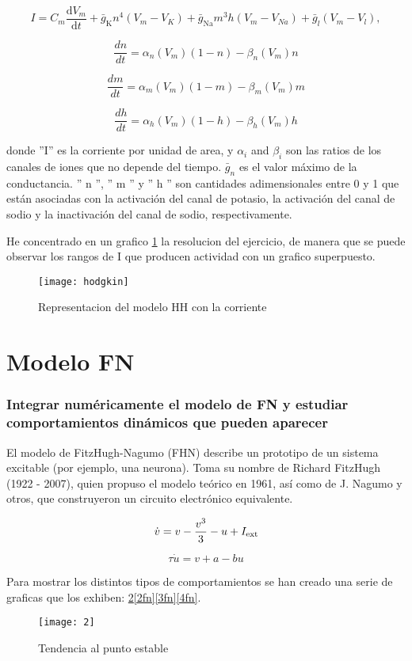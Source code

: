  $$I = C_m\frac{{\mathrm d} V_m}{{\mathrm d} t}  + \bar{g}_\text{K}n^4(V_m - V_K) + \bar{g}_\text{Na}m^3h(V_m - V_{Na}) + \bar{g}_l(V_m - V_l),$$

 $$\frac{dn}{dt} = \alpha_n(V_m)(1 - n) - \beta_n(V_m) n$$

 $$\frac{dm}{dt} = \alpha_m(V_m)(1 - m)  - \beta_m(V_m) m$$

 $$\frac{dh}{dt} = \alpha_h(V_m)(1 - h) - \beta_h(V_m) h$$

donde ''I'' es la corriente por unidad de area, y $\alpha_i $ and $\beta_i $ son las ratios de los canales de iones que no depende del tiempo. $\bar{g}_n$ es el valor máximo de la conductancia. '' n '', '' m '' y '' h '' son cantidades adimensionales entre 0 y 1 que están asociadas con la activación del canal de potasio, la activación del canal de sodio y la inactivación del canal de sodio, respectivamente. 

He concentrado en un grafico \ref{h} la resolucion del ejercicio, de manera que se puede observar los rangos de I que producen actividad con un grafico superpuesto. 
\begin{figure}
	\centering
	\texttt{[image: hodgkin]}
	\caption{Representacion del modelo HH con la corriente}
	\label{h}
\end{figure}

\section{Modelo FN}

\subsubsection{\large Integrar numéricamente el modelo de FN y estudiar comportamientos dinámicos que pueden aparecer} 


El modelo de FitzHugh-Nagumo (FHN) describe un prototipo de un sistema excitable (por ejemplo, una neurona). Toma su nombre de Richard FitzHugh (1922 - 2007), quien propuso el modelo teórico en 1961, así como de J. Nagumo y otros, que construyeron un circuito electrónico equivalente.

$$
 \dot{v}=v-\frac{v^3}{3} - u + I_{\rm ext} 
 $$
 
 $$
 \tau \dot{u} = v+a-b u
 $$

Para mostrar los distintos tipos de comportamientos se han creado una serie de graficas que los exhiben: \ref{1fn}\ref{2fn}\ref{3fn}\ref{4fn}.

\begin{figure}
	\centering
	\texttt{[image: 2]}
	\caption{Tendencia al punto estable}
	\label{1fn}
\end{figure}

